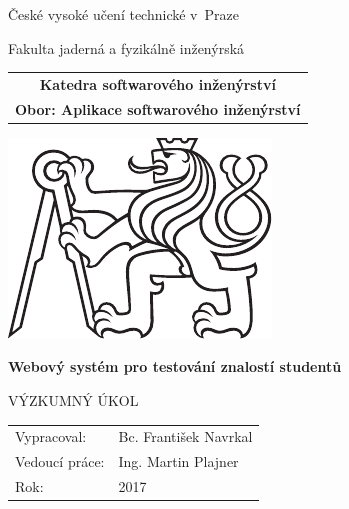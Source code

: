 \documentclass[a4paper,twoside,12pt]{book}
\newcommand{\tb}{\textbf} %
\newcommand{\cvut}{České vysoké učení technické v~Praze}
\newcommand{\fjfi}{Fakulta jaderná a fyzikálně inženýrská}
\newcommand{\ksi}{Katedra softwarového inženýrství}
\newcommand{\obor}{Aplikace softwarového inženýrství} %
\newcommand{\druh}{Výzkumný úkol} %
\newcommand{\logoCVUT}{\includegraphics{symbol_cvut_konturova_verze_cb.pdf}} %
\newcommand{\nazevcz}{Webový systém pro testování znalostí studentů}    %
\newcommand{\nazeven}{}          %
\newcommand{\autor}{Bc. František Navrkal}   %
\newcommand{\vedouci}{Ing. Martin Plajner} %
\newcommand{\rok}{2017}  %
\begin{document}
\thispagestyle{empty}

\begin{center}
	{\LARGE
		\cvut\par
		\fjfi
	}
    \vspace{10mm}

    \begin{tabular}{c}
		\tb{\ksi} \\[3pt]
		\tb{Obor: \obor}\\
    \end{tabular}

   \vspace{10mm} \logoCVUT \vspace{15mm}

   {\huge \tb{\nazevcz}\par}
   \vspace{5mm}
   {\huge \tb{\nazeven}\par}

   \vspace{15mm}
   {\Large \MakeUppercase{\druh}}

   \vfill
   {\large
    \begin{tabular}{ll}
    Vypracoval: & \autor\\
    Vedoucí práce: & \vedouci\\
    Rok: & \rok
    \end{tabular}
   }
\end{center}

\clearpage{\pagestyle{empty}\cleardoublepage} %

\newpage  %
\thispagestyle{empty} %

%
%
%
\end{document}
